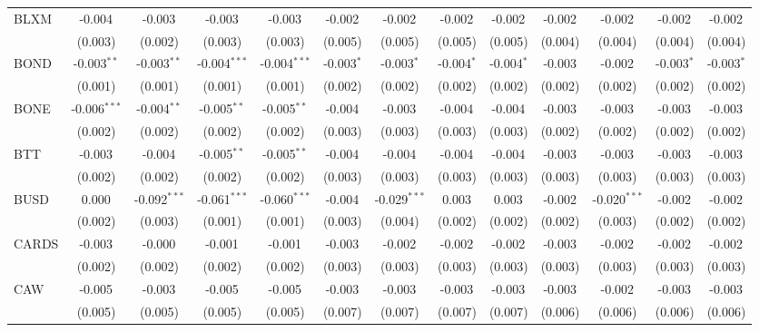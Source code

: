\begin{table}[!htbp]
\begin{tabular}{@{\extracolsep{5pt}}lcccccccccccc}
 BLXM & -0.004$^{}$ & -0.003$^{}$ & -0.003$^{}$ & -0.003$^{}$ & -0.002$^{}$ & -0.002$^{}$ & -0.002$^{}$ & -0.002$^{}$ & -0.002$^{}$ & -0.002$^{}$ & -0.002$^{}$ & -0.002$^{}$ \\
  & (0.003) & (0.002) & (0.003) & (0.003) & (0.005) & (0.005) & (0.005) & (0.005) & (0.004) & (0.004) & (0.004) & (0.004) \\
 BOND & -0.003$^{**}$ & -0.003$^{**}$ & -0.004$^{***}$ & -0.004$^{***}$ & -0.003$^{*}$ & -0.003$^{*}$ & -0.004$^{*}$ & -0.004$^{*}$ & -0.003$^{}$ & -0.002$^{}$ & -0.003$^{*}$ & -0.003$^{*}$ \\
  & (0.001) & (0.001) & (0.001) & (0.001) & (0.002) & (0.002) & (0.002) & (0.002) & (0.002) & (0.002) & (0.002) & (0.002) \\
 BONE & -0.006$^{***}$ & -0.004$^{**}$ & -0.005$^{**}$ & -0.005$^{**}$ & -0.004$^{}$ & -0.003$^{}$ & -0.004$^{}$ & -0.004$^{}$ & -0.003$^{}$ & -0.003$^{}$ & -0.003$^{}$ & -0.003$^{}$ \\
  & (0.002) & (0.002) & (0.002) & (0.002) & (0.003) & (0.003) & (0.003) & (0.003) & (0.002) & (0.002) & (0.002) & (0.002) \\
 BTT & -0.003$^{}$ & -0.004$^{}$ & -0.005$^{**}$ & -0.005$^{**}$ & -0.004$^{}$ & -0.004$^{}$ & -0.004$^{}$ & -0.004$^{}$ & -0.003$^{}$ & -0.003$^{}$ & -0.003$^{}$ & -0.003$^{}$ \\
  & (0.002) & (0.002) & (0.002) & (0.002) & (0.003) & (0.003) & (0.003) & (0.003) & (0.003) & (0.003) & (0.003) & (0.003) \\
 BUSD & 0.000$^{}$ & -0.092$^{***}$ & -0.061$^{***}$ & -0.060$^{***}$ & -0.004$^{}$ & -0.029$^{***}$ & 0.003$^{}$ & 0.003$^{}$ & -0.002$^{}$ & -0.020$^{***}$ & -0.002$^{}$ & -0.002$^{}$ \\
  & (0.002) & (0.003) & (0.001) & (0.001) & (0.003) & (0.004) & (0.002) & (0.002) & (0.002) & (0.003) & (0.002) & (0.002) \\
 CARDS & -0.003$^{}$ & -0.000$^{}$ & -0.001$^{}$ & -0.001$^{}$ & -0.003$^{}$ & -0.002$^{}$ & -0.002$^{}$ & -0.002$^{}$ & -0.003$^{}$ & -0.002$^{}$ & -0.002$^{}$ & -0.002$^{}$ \\
  & (0.002) & (0.002) & (0.002) & (0.002) & (0.003) & (0.003) & (0.003) & (0.003) & (0.003) & (0.003) & (0.003) & (0.003) \\
 CAW & -0.005$^{}$ & -0.003$^{}$ & -0.005$^{}$ & -0.005$^{}$ & -0.003$^{}$ & -0.003$^{}$ & -0.003$^{}$ & -0.003$^{}$ & -0.003$^{}$ & -0.002$^{}$ & -0.003$^{}$ & -0.003$^{}$ \\
  & (0.005) & (0.005) & (0.005) & (0.005) & (0.007) & (0.007) & (0.007) & (0.007) & (0.006) & (0.006) & (0.006) & (0.006) \\

\end{tabular}
\end{table}
